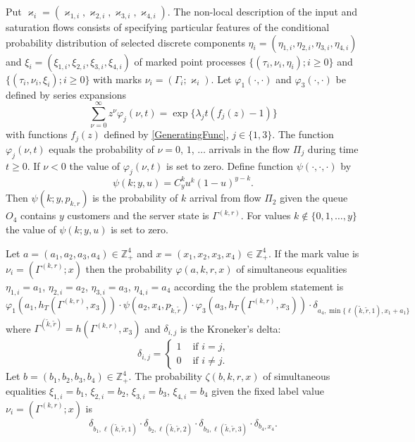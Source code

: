 \documentclass[runningheads,a4paper]{llncs}
\begin{document}
Put $\varkappa_i=(\varkappa_{1,i},\varkappa_{2,i},\varkappa_{3,i},\varkappa_{4,i})$. The non-local
description of the input and saturation flows consists of specifying particular features of the
 conditional probability distribution of selected discrete components
$\eta_i=(\eta_{1,i},\eta_{2,i}, \eta_{3,i}, \eta_{4,i})$ and $\xi_i=(\xi_{1,i}, \xi_{2,i},
\xi_{3,i}, \xi_{4,i})$ of marked point processes $\{(\tau_i, \nu_i, \eta_i); i\geqslant 0\}$ and
$\{(\tau_i, \nu_i, \xi_i); i\geqslant 0\}$ with marks $\nu_i = (\Gamma_i;\varkappa_i)$. Let
$\varphi_1(\cdot,\cdot)$ and $\varphi_3(\cdot,\cdot)$ be defined by series expansions
\begin{equation*}
\sum_{\nu=0}^{\infty} z^\nu\varphi_j(\nu,t) = \exp\{\lambda_j t (f_j(z)-1)\}
\end{equation*}
with functions $f_j(z)$ defined by \eqref{GeneratingFunc}, $j \in \{1,3\}$. The function
$\varphi_j(\nu,t)$ equals the probability of  $\nu=0$, $1$, $\ldots${} arrivals in the flow
$\Pi_j$ during time $t \geqslant 0$. If $\nu < 0$ the value of $\varphi_j(\nu,t)$ is set to
zero. Define function $\psi(\cdot,\cdot,\cdot)$ by
\begin{equation*}
\psi(k;y,u)=C_y^k u^k (1-u)^{y-k}.	
\end{equation*}
Then $\psi(k;y,p_{k,r})$ is the probability of $k$ arrival from flow $\Pi_2$ given the queue $O_4$
contains $y$ customers and the server state is $\Gamma^{(k,r)}$. For values $k\not\in\{0, 1, \ldots,
y\}$ the value of $\psi(k;y,u)$ is set to zero.

Let $a=(a_1, a_2, a_3, a_4) \in \mathbb{Z}_+^4$ and $x=(x_1, x_2, x_3, x_4) \in
\mathbb{Z}_+^4$. If the mark value is 
$\nu_i=(\Gamma^{(k,r)}; x)$ then the probability $\varphi(a,k,r,x)$ of simultaneous
equalities  $\eta_{1,i}=a_1$, $\eta_{2,i}=a_2$, $\eta_{3,i}=a_3$, $\eta_{4,i}=a_4$ according the the
problem statement is
\begin{equation*}
\varphi_1(a_1,h_T(\Gamma^{(k,r)},x_3)) \cdot \psi(a_2,x_4, p_{\tilde{k},\tilde{r}}) \cdot \varphi_3(a_3,h_T(\Gamma^{(k,r)},x_3))
\cdot \delta_{a_4,\min{\{\ell{(\tilde{k},\tilde{r},1)}, x_1+a_1}\}}
\label{conditionProbOne}
\end{equation*}
where $\Gamma^{(\tilde{k},\tilde{r})}=h(\Gamma^{(k,r)},x_3)$ and $\delta_{i,j}$ is the Kroneker's delta:
\begin{equation*}
\delta_{i,j}=\begin{cases} 1 &\text{ if $i=j$,}\\0 &\text{ if $i\neq j$.}
\end{cases}
\end{equation*}
Let $b=(b_1, b_2, b_3, b_4) \in \mathbb{Z}_+^4$. The probability $\zeta(b, k, r, x)$  of
simultaneous equalities $\xi_{1,i}=b_1$, $\xi_{2,i}=b_2$, $\xi_{3,i}=b_3$, $\xi_{4,i}=b_4$ given the
fixed label value $\nu_i=(\Gamma^{(k,r)}; x)$ is
\begin{equation*}
\delta_{b_1,\ell(\tilde{k},\tilde{r},1)} \cdot \delta_{b_2,\ell(\tilde{k},\tilde{r},2)} \cdot
\delta_{b_3,\ell(\tilde{k},\tilde{r},3)} \cdot \delta_{b_4,x_4}.
\label{conditionProbTwo}
\end{equation*}
\end{document}
